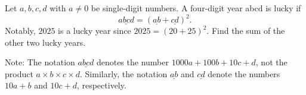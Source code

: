 Let $a, b, c, d$ with $a \ne 0$ be single-digit numbers. A four-digit year abcd is lucky if \[\underline{abcd} = (\underline{ab} + \underline{cd})^2.\]Notably, $2025 $ is a lucky year since $2025 = (20 + 25)^2$. Find the sum of the other two lucky years.



Note: The notation $\underline{abcd}$ denotes the number $1000a+100b+10c+d$, not the product $a\times b\times c\times d$. Similarly, the notation $\underline{ab}$ and $\underline{cd}$ denote the numbers $10a + b$ and $10c + d$, respectively.
